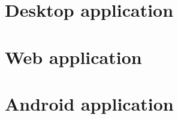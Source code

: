 \section{Desktop application}
\FloatBarrier

\section{Web application}

\FloatBarrier
\section{Android application}
